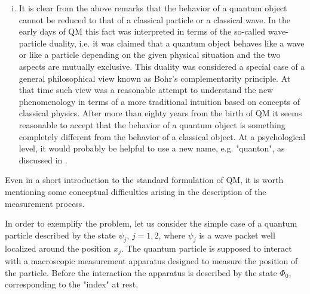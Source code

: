 \documentclass[12pt,reqno]{amsart}
\newcommand{\n}{\relax}
\newcommand{\vs}{\medskip}
\numberwithin{equation}{section}
\begin{document}
\begin{enumerate}[(i)]
\item  It is  clear from the above remarks that the behavior of a quantum object  cannot  be reduced to that of a classical particle or a classical wave.  In the early days of QM this fact was interpreted in terms of the so-called wave-particle duality, i.e. it was claimed that  a quantum object behaves like a   wave or like a particle depending on the given physical situation and the two aspects are mutually exclusive. This duality was considered a special case of a  general philosophical view known as Bohr's complementarity principle. At that time such view was a reasonable attempt to understand  the new  phenomenology in terms of a more traditional intuition based on concepts of classical physics.   After more than eighty years from the birth of QM  it seems reasonable to accept that the behavior of  a quantum object is something completely different from the behavior of a classical object. At a psychological  level,   it would  probably be  helpful   to use a new name, e.g.  "quanton", as discussed in \cite{bl}.
\end{enumerate}


\vs
\n
Even in a short introduction to the standard formulation of QM, it is worth mentioning some conceptual difficulties arising in the description of the measurement process. 
 
 
\n 
In order to exemplify the problem, let us consider the simple case of a quantum particle described by the state $\psi_j$, $j=1,2$, where $\psi_j$ is a  wave packet well localized around the position $x_j$. The quantum particle is supposed to interact with a macroscopic measurement apparatus designed to measure the position of the particle. 
Before the interaction the apparatus is described by the state $\Phi_0$, corresponding to the "index" at rest.
 
\end{document}
